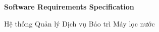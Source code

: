 \documentclass[12pt,a4paper,oneside]{report}
\begin{document}

\begin{titlepage}

\centering

\vspace*{2cm}

{\Huge\bfseries
Software Requirements Specification
\par}

\vspace{1cm}

{\Large
Hệ thống Quản lý Dịch vụ Bảo trì Máy lọc nước
\par}


\end{titlepage}


\tableofcontents
\clearpage

















\appendix
\end{document}
